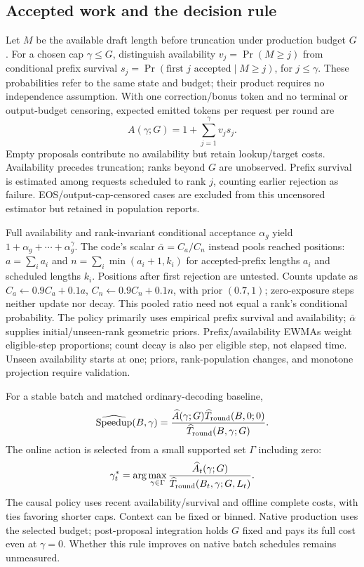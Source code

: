 \documentclass[conference,letterpaper]{IEEEtran}
\begin{document}
\subsection{Accepted work and the decision rule}
Let $M$ be the available draft length before truncation under production budget $G$. For a chosen cap $\gamma\leq G$, distinguish availability $v_j=\Pr(M\geq j)$ from conditional prefix survival $s_j=\Pr(\text{first }j\text{ accepted}\mid M\geq j)$, for $j\leq\gamma$. These probabilities refer to the same state and budget; their product requires no independence assumption. With one correction/bonus token and no terminal or output-budget censoring, expected emitted tokens per request per round are
\begin{equation}\label{eq:a}
A(\gamma;G)=1+\sum_{j=1}^{\gamma}v_j s_j.
\end{equation}
Empty proposals contribute no availability but retain lookup/target costs. Availability precedes truncation; ranks beyond $G$ are unobserved. Prefix survival is estimated among requests scheduled to rank $j$, counting earlier rejection as failure. EOS/output-cap-censored cases are excluded from this uncensored estimator but retained in population reports.

Full availability and rank-invariant conditional acceptance $\alpha_g$ yield $1+\alpha_g+\cdots+\alpha_g^\gamma$. The code's scalar $\bar\alpha=C_a/C_n$ instead pools reached positions: $a=\sum_i a_i$ and $n=\sum_i\min(a_i+1,k_i)$ for accepted-prefix lengths $a_i$ and scheduled lengths $k_i$. Positions after first rejection are untested. Counts update as $C_a\leftarrow0.9C_a+0.1a$, $C_n\leftarrow0.9C_n+0.1n$, with prior $(0.7,1)$; zero-exposure steps neither update nor decay. This pooled ratio need not equal a rank's conditional probability. The policy primarily uses empirical prefix survival and availability; $\bar\alpha$ supplies initial/unseen-rank geometric priors. Prefix/availability EWMAs weight eligible-step proportions; count decay is also per eligible step, not elapsed time. Unseen availability starts at one; priors, rank-population changes, and monotone projection require validation.

For a stable batch and matched ordinary-decoding baseline,
\begin{equation}\label{eq:speed}
\widehat{\rm Speedup}(B,\gamma)=
\frac{\widehat A(\gamma;G)\widehat T_{\rm round}(B,0;0)}
{\widehat T_{\rm round}(B,\gamma;G)}.
\end{equation}
The online action is selected from a small supported set $\Gamma$ including zero:
\begin{equation}\label{eq:policy}
\gamma_t^*=\arg\max_{\gamma\in\Gamma}
\frac{\widehat A_t(\gamma;G)}
{\widehat T_{\rm round}(B_t,\gamma;G,L_t)}.
\end{equation}
The causal policy uses recent availability/survival and offline complete costs, with ties favoring shorter caps. Context can be fixed or binned. Native production uses the selected budget; post-proposal integration holds $G$ fixed and pays its full cost even at $\gamma=0$. Whether this rule improves on native batch schedules remains unmeasured.
\end{document}
